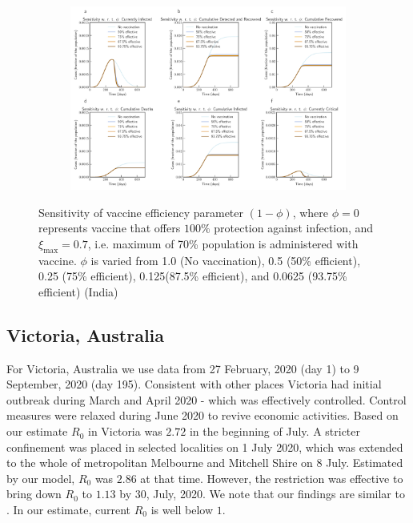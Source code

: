 \documentclass[fleqn,10pt]{wlscirep}
\begin{document}
\begin{figure}[t!]
	\centering
	\begin{subfigure}[b]{\textwidth}
		\centering
		\includegraphics[width=1\linewidth]{India_scenario_vaccination0.7.pdf}
	\end{subfigure}
	\caption{Sensitivity of vaccine efficiency parameter $(1-\phi)$, where $\phi = 0$ represents vaccine that offers $100\%$ protection against infection, and $\xi_{\max} = 0.7$, i.e. maximum of 70\% population is administered with vaccine. $\phi$ is varied from 1.0 (No vaccination), 0.5 (50\% efficient), 0.25 (75\% efficient), 0.125(87.5\% efficient), and 0.0625 (93.75\% efficient) (India)}
	\label{fig9B} 
\end{figure}

\subsection*{Victoria, Australia}
For Victoria, Australia we use data from 27 February, 2020 (day 1) to 9 September, 2020 (day 195). Consistent with other places Victoria had initial outbreak during March and April 2020 - which was effectively controlled.  Control measures were relaxed during June 2020 to revive economic activities.  Based on our estimate $R_0$ in Victoria was $2.72$ in the beginning of July.  A stricter confinement was placed in selected localities on 1 July 2020, which was extended to the whole of metropolitan Melbourne and Mitchell Shire on 8 July. Estimated by our model, $R_0$ was $2.86$ at that time. However, the restriction was effective to bring down $R_0$ to $1.13$ by 30, July, 2020. We note that our findings are similar to \cite{Saul2020}. In our estimate, current $R_0$ is well below $1$. 
\end{document}
